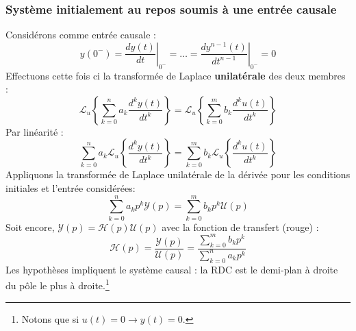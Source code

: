 \subsubsection{Système initialement au repos soumis à une entrée causale}
Considérons comme entrée causale :
\begin{equation}
	y(0^-) = \left.\frac{dy(t)}{dt}\right|_{0^-} = \dots = \left.\frac{dy^{n-1}(t)}{dt^{n-1}}
	\right|_{0^-} = 0
\end{equation}
Effectuons cette fois ci la transformée de Laplace \textbf{unilatérale} des deux membres :
\begin{equation}
	\mathcal{L}_u\left\{\sum_{k=0}^n a_k\dfrac{d^ky(t)}{dt^k}\right\} =	\mathcal{L}_u\left\{
	\sum_{k=0}^m b_k\dfrac{d^ku(t)}{dt^k}\right\}
\end{equation}
Par linéarité :
\begin{equation}
	\sum_{k=0}^n a_k\mathcal{L}_u\left\{\dfrac{d^ky(t)}{dt^k}\right\} =	\sum_{k=0}^m b_k
	\mathcal{L}_u\left\{\dfrac{d^ku(t)}{dt^k}\right\}
\end{equation}
Appliquons la transformée de Laplace unilatérale de la dérivée pour les conditions initiales 
et l’entrée considérées:
\begin{equation}
	\sum_{k=0}^n a_kp^k\mathcal{Y}(p) = \sum_{k=0}^m b_kp^k\mathcal{U}(p)
\end{equation}
Soit encore, $\mathcal{Y}(p) = \mathcal{H}(p)\mathcal{U}(p)$ avec la fonction de transfert 
(rouge) :
\begin{equation}
	\mathcal{H}(p) = \frac{\mathcal{Y}(p)}{\mathcal{U}(p)} = \frac{\sum_{k=0}^m b_kp^k}{\sum_{k=0}^n
	a_kp^k}
\end{equation}
Les hypothèses impliquent le système causal : la RDC est le demi-plan à droite du pôle le
plus à droite.\footnote{Notons que si $u(t) = 0 \rightarrow y(t) =0$.}
	
	
